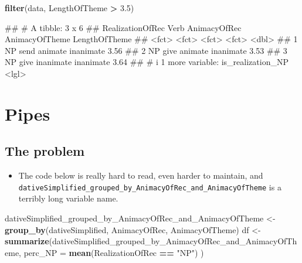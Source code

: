 \documentclass[
]{book}
\newenvironment{Shaded}{\begin{snugshade}}{\end{snugshade}}
\newcommand{\AttributeTok}[1]{\textcolor[rgb]{0.13,0.29,0.53}{#1}}
\newcommand{\FloatTok}[1]{\textcolor[rgb]{0.00,0.00,0.81}{#1}}
\newcommand{\FunctionTok}[1]{\textcolor[rgb]{0.13,0.29,0.53}{\textbf{#1}}}
\newcommand{\NormalTok}[1]{#1}
\newcommand{\OtherTok}[1]{\textcolor[rgb]{0.56,0.35,0.01}{#1}}
\newcommand{\SpecialCharTok}[1]{\textcolor[rgb]{0.81,0.36,0.00}{\textbf{#1}}}
\newcommand{\StringTok}[1]{\textcolor[rgb]{0.31,0.60,0.02}{#1}}
\providecommand{\tightlist}{%
  \setlength{\itemsep}{0pt}\setlength{\parskip}{0pt}}
\begin{document}
\begin{Shaded}
\begin{Highlighting}[]
\FunctionTok{filter}\NormalTok{(data, LengthOfTheme }\SpecialCharTok{\textgreater{}} \FloatTok{3.5}\NormalTok{)}
\end{Highlighting}
\end{Shaded}

\begin{Shaded}
\begin{Highlighting}[]
\NormalTok{\#\# \# A tibble: 3 x 6}
\NormalTok{\#\#   RealizationOfRec Verb  AnimacyOfRec AnimacyOfTheme LengthOfTheme}
\NormalTok{\#\#   \textless{}fct\textgreater{}            \textless{}fct\textgreater{} \textless{}fct\textgreater{}        \textless{}fct\textgreater{}                  \textless{}dbl\textgreater{}}
\NormalTok{\#\# 1 NP               send  animate      inanimate               3.56}
\NormalTok{\#\# 2 NP               give  animate      inanimate               3.53}
\NormalTok{\#\# 3 NP               give  inanimate    inanimate               3.64}
\NormalTok{\#\# \# i 1 more variable: is\_realization\_NP \textless{}lgl\textgreater{}}
\end{Highlighting}
\end{Shaded}

\hypertarget{pipes}{%
\section{Pipes}\label{pipes}}

\hypertarget{the-problem}{%
\subsection{The problem}\label{the-problem}}

\begin{itemize}
\tightlist
\item
  The code below is really hard to read, even harder to maintain, and \texttt{dativeSimplified\_grouped\_by\_AnimacyOfRec\_and\_AnimacyOfTheme} is a terribly long variable name.
\end{itemize}

\begin{Shaded}
\begin{Highlighting}[]
\NormalTok{dativeSimplified\_grouped\_by\_AnimacyOfRec\_and\_AnimacyOfTheme }\OtherTok{\textless{}{-}}
      \FunctionTok{group\_by}\NormalTok{(dativeSimplified, AnimacyOfRec, AnimacyOfTheme)}
\NormalTok{df }\OtherTok{\textless{}{-}} \FunctionTok{summarize}\NormalTok{(dativeSimplified\_grouped\_by\_AnimacyOfRec\_and\_AnimacyOfTheme, }
                  \AttributeTok{perc\_NP =} \FunctionTok{mean}\NormalTok{(RealizationOfRec }\SpecialCharTok{==} \StringTok{"NP"}\NormalTok{) )}
\end{Highlighting}
\end{Shaded}
\end{document}
